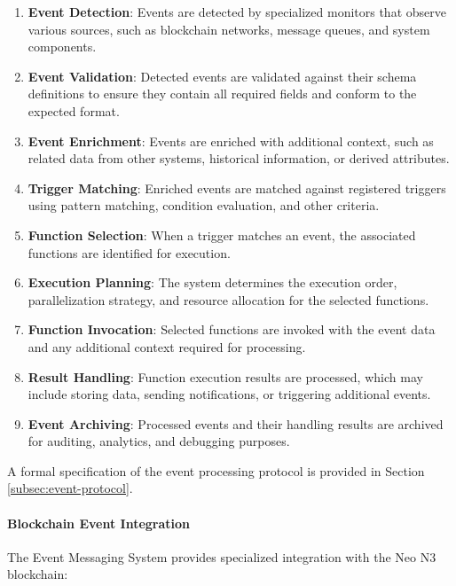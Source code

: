 \begin{enumerate}
    \item \textbf{Event Detection}: Events are detected by specialized monitors that observe various sources, such as blockchain networks, message queues, and system components.
    
    \item \textbf{Event Validation}: Detected events are validated against their schema definitions to ensure they contain all required fields and conform to the expected format.
    
    \item \textbf{Event Enrichment}: Events are enriched with additional context, such as related data from other systems, historical information, or derived attributes.
    
    \item \textbf{Trigger Matching}: Enriched events are matched against registered triggers using pattern matching, condition evaluation, and other criteria.
    
    \item \textbf{Function Selection}: When a trigger matches an event, the associated functions are identified for execution.
    
    \item \textbf{Execution Planning}: The system determines the execution order, parallelization strategy, and resource allocation for the selected functions.
    
    \item \textbf{Function Invocation}: Selected functions are invoked with the event data and any additional context required for processing.
    
    \item \textbf{Result Handling}: Function execution results are processed, which may include storing data, sending notifications, or triggering additional events.
    
    \item \textbf{Event Archiving}: Processed events and their handling results are archived for auditing, analytics, and debugging purposes.
\end{enumerate}

A formal specification of the event processing protocol is provided in Section \ref{subsec:event-protocol}.



\paragraph{Blockchain Event Integration}
The Event Messaging System provides specialized integration with the Neo N3 blockchain:

